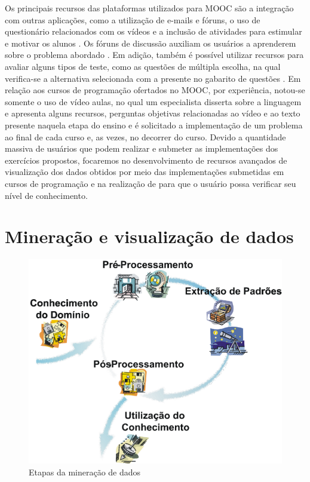 		Os principais recursos das plataformas utilizados para \acs{MOOC} são a integração
		com outras aplicações, como a utilização de e-mails e fóruns, o uso de questionário
		relacionados com os vídeos e a inclusão de atividades para estimular e motivar
		os alunos \cite{fassbinder2014}. Os fóruns de discussão auxiliam os usuários
		a aprenderem sobre o problema abordado \cite{schmidt2013producing}.
		Em adição, também é possível utilizar recursos para avaliar alguns tipos de
		teste, como as questões de múltipla escolha, na qual verifica-se a alternativa
		selecionada com a presente no gabarito de questões \cite{alario2013analysing}.
		Em relação aos cursos de programação ofertados no \acs{MOOC}, por experiência,
		notou-se somente o uso de vídeo aulas, no qual um especialista disserta sobre
		a linguagem e apresenta alguns recursos, perguntas objetivas relacionadas ao
		vídeo e ao texto presente naquela etapa do ensino e é solicitado a implementação
		de um problema ao final de cada curso e, as vezes, no decorrer do curso.
		Devido a quantidade massiva de usuários que podem realizar e submeter as
		implementações dos exercícios propostos, focaremos no desenvolvimento de
		recursos avançados de visualização dos dados obtidos por meio das implementações
		submetidas em cursos de programação e na realização de  para
		que o usuário possa verificar seu nível de conhecimento.

	\section{Mineração e visualização de dados}
	\label{sec:FundTeor}
		
		\begin{figure}[b]
			\centering
			\includegraphics[width=0.6\linewidth]{imagem/mineracaoDados}
			\caption[Etapas da mineração de dados]{Etapas da mineração de dados \cite{rezende2003}}
			\label{fig:mineracaoDados}
		\end{figure}
		
